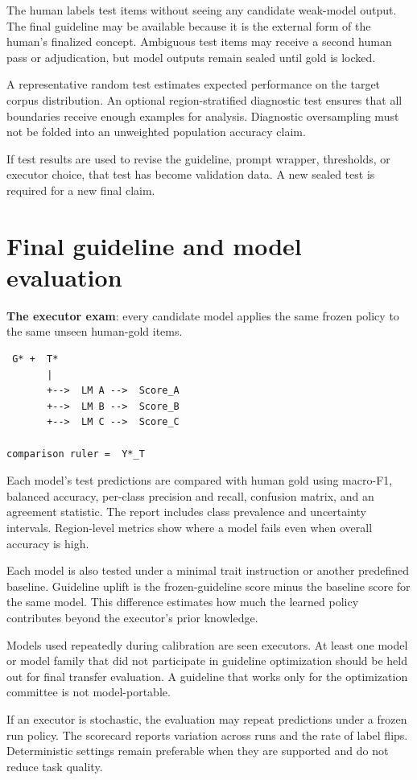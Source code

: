 The human labels test items without seeing any candidate weak-model output. The final guideline may be available because it is the external form of the human's finalized concept. Ambiguous test items may receive a second human pass or adjudication, but model outputs remain sealed until gold is locked.

A representative random test estimates expected performance on the target corpus distribution. An optional region-stratified diagnostic test ensures that all boundaries receive enough examples for analysis. Diagnostic oversampling must not be folded into an unweighted population accuracy claim.

If test results are used to revise the guideline, prompt wrapper, thresholds, or executor choice, that test has become validation data. A new sealed test is required for a new final claim.


\section{Final guideline and model evaluation}
\textbf{The executor exam}: every candidate model applies the same frozen policy to the same unseen human-gold items.

\begin{verbatim}
 G* +  T*
       |
       +-->  LM A -->  Score_A
       +-->  LM B -->  Score_B
       +-->  LM C -->  Score_C

comparison ruler =  Y*_T
\end{verbatim}
Each model's test predictions are compared with human gold using macro-F1, balanced accuracy, per-class precision and recall, confusion matrix, and an agreement statistic. The report includes class prevalence and uncertainty intervals. Region-level metrics show where a model fails even when overall accuracy is high.

Each model is also tested under a minimal trait instruction or another predefined baseline. Guideline uplift is the frozen-guideline score minus the baseline score for the same model. This difference estimates how much the learned policy contributes beyond the executor's prior knowledge.

Models used repeatedly during calibration are seen executors. At least one model or model family that did not participate in guideline optimization should be held out for final transfer evaluation. A guideline that works only for the optimization committee is not model-portable.

If an executor is stochastic, the evaluation may repeat predictions under a frozen run policy. The scorecard reports variation across runs and the rate of label flips. Deterministic settings remain preferable when they are supported and do not reduce task quality.


